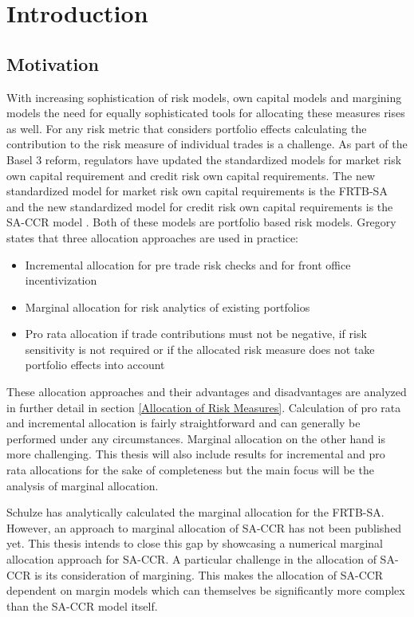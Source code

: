 \documentclass[../Thesis_AHoecherl.tex]{subfiles}
\begin{document}
    \chapter{Introduction}
    \section{Motivation}
    With increasing sophistication of risk models, own capital models and margining models the need for equally sophisticated tools for allocating these measures rises as well. For any risk metric that considers portfolio effects calculating the contribution to the risk measure of individual trades is a challenge. As part of the Basel 3 reform,  regulators have updated the standardized models for market risk own capital requirement and credit risk own capital requirements. The new standardized model for market risk own capital requirements is the FRTB-SA  and the new standardized model for credit risk own capital requirements is the SA-CCR model . Both of these models are portfolio based risk models. Gregory \cite[Chapter~10.7]{gregory2015xva} states that three allocation approaches are used in practice:

    \begin{itemize}
        \item Incremental allocation for pre trade risk checks and for front office incentivization  
        \item Marginal allocation for risk analytics of existing portfolios 
        \item Pro rata allocation if trade contributions must not be negative, if risk sensitivity is not required or if the allocated risk measure does not take portfolio effects into account
    \end{itemize}

    These allocation approaches and their advantages and disadvantages are analyzed in further detail in section \ref{Allocation of Risk Measures}. Calculation of pro rata and incremental allocation is fairly straightforward and can generally be performed under any circumstances. Marginal allocation on the other hand is more challenging. This thesis will also include results for incremental and pro rata allocations for the sake of completeness but the main focus will be the analysis of marginal allocation.

    Schulze \cite{schulze2018capital} has analytically calculated the marginal allocation for the FRTB-SA. However, an approach to marginal allocation of SA-CCR has not been published yet. This thesis intends to close this gap by showcasing a numerical marginal allocation approach for SA-CCR. A particular challenge in the allocation of SA-CCR is its consideration of margining. This makes the allocation of SA-CCR dependent on margin models which can themselves be significantly more complex than the SA-CCR model itself.
\end{document}
